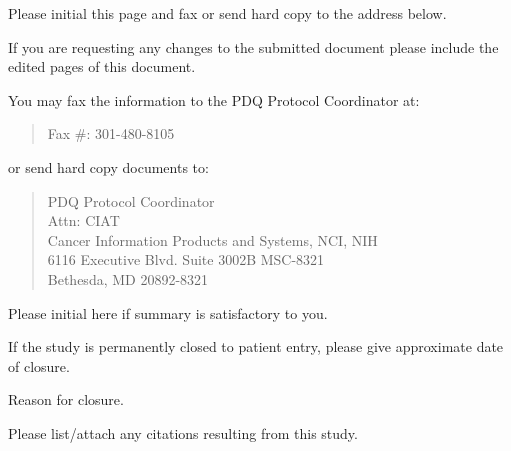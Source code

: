 \documentclass[12pt]{article}
\begin{document}

\newpage
Please initial this page and fax or send hard copy to the address below. 

If you are requesting any changes to the submitted document please include 
the edited pages of this document.

You may fax the information to the PDQ Protocol Coordinator at:
\begin{verse}
Fax \#:  301-480-8105
\end{verse}

or send hard copy documents to:
\begin{verse}
PDQ Protocol Coordinator    \\
Attn: CIAT                  \\
Cancer Information Products and Systems, NCI, NIH   \\
6116 Executive Blvd. Suite 3002B MSC-8321           \\
Bethesda, MD 20892-8321
\end{verse}

Please initial here if summary is satisfactory to you. 
\hrulefill

If the study is permanently closed to patient entry, please give approximate 
date of closure. 
\hrulefill

Reason for closure. 
\hrulefill      \newline
\mbox{}\hrulefill \newline
\mbox{}\hrulefill \newline
\mbox{}\hrulefill \newline
\mbox{}\hrulefill

Please list/attach any citations resulting from this study.
\vfill
\end{document}
